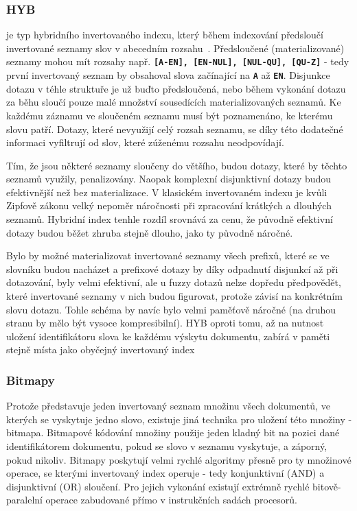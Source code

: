 \documentclass[11pt,letterpaper,oneside,openright]{book}
\newcommand{\bftt}[1]{\texttt{\textbf{#1}}}
\begin{document}
\subsubsection{HYB} \label{sec:hyb} je typ hybridního invertovaného indexu,
který během indexování předsloučí invertované seznamy slov v abecedním
rozsahu~\cite{Bast:2006:TLF:1148170.1148234}. Předsloučené (materializované)
seznamy mohou mít rozsahy např. \bftt{[A-EN], [EN-NUL], [NUL-QU], [QU-Z]} -
tedy první invertovaný seznam by obsahoval slova začínající na \bftt{A} až
\bftt{EN}. Disjunkce dotazu v téhle struktuře je už buďto předsloučená, nebo
během vykonání dotazu za běhu sloučí pouze malé množství sousedících
materializovaných seznamů. Ke každému záznamu ve sloučeném seznamu musí být
poznamenáno, ke kterému slovu patří. Dotazy, které nevyužijí celý rozsah
seznamu, se díky této dodatečné informaci vyfiltrují od slov, které zúženému
rozsahu neodpovídají.

Tím, že jsou některé seznamy sloučeny do většího, budou dotazy, které by těchto
seznamů využily, penalizovány. Naopak komplexní disjunktivní dotazy budou
efektivnější než bez materializace. V klasickém invertovaném indexu je kvůli
Zipfově zákonu velký nepoměr náročnosti při zpracování krátkých a dlouhých
seznamů. Hybridní index tenhle rozdíl srovnává za cenu, že původně efektivní
dotazy budou běžet zhruba stejně dlouho, jako ty původně náročné.

Bylo by možné materializovat invertované seznamy všech prefixů, které se ve
slovníku budou nacházet a prefixové dotazy by díky odpadnutí disjunkcí až při
dotazování, byly velmi efektivní, ale u fuzzy dotazů nelze dopředu předpovědět,
které invertované seznamy v nich budou figurovat, protože závisí na konkrétním
slovu dotazu. Tohle schéma by navíc bylo velmi paměťově náročné (na druhou
stranu by mělo být vysoce kompresibilní). HYB oproti tomu, až na nutnost
uložení identifikátoru slova ke každému výskytu dokumentu, zabírá v paměti
stejně místa jako obyčejný invertovaný index

\subsubsection{Bitmapy}
Protože představuje jeden invertovaný seznam množinu všech dokumentů, ve
kterých se vyskytuje jedno slovo, existuje jiná technika pro uložení této
množiny - bitmapa. Bitmapové kódování množiny použije jeden kladný bit na
pozici dané identifikátorem dokumentu, pokud se slovo v seznamu vyskytuje, a
záporný, pokud nikoliv. Bitmapy poskytují velmi rychlé algoritmy přesně pro ty
množinové operace, se kterými invertovaný index operuje - tedy konjunktivní
(AND) a disjunktivní (OR) sloučení. Pro jejich vykonání existují extrémně
rychlé bitově-paralelní operace zabudované přímo v instrukčních sadách
procesorů.
\end{document}
